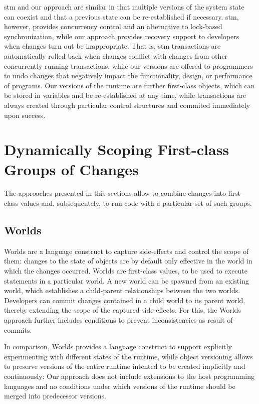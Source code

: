 \ac{stm} and our approach are similar in that multiple versions of the system state can coexist and that a previous state can be re-established if necessary.
\ac{stm}, however, provides concurrency control and an alternative to lock-based synchronization, while our approach provides recovery support to developers when changes turn out be inappropriate.
That is, \ac{stm} transactions are automatically rolled back when changes conflict with changes from other concurrently running transactions, while our versions are offered to programmers to undo changes that negatively impact the functionality, design, or performance of programs. 
Our versions of the runtime are further first-class objects, which can be stored in variables and be re-established at any time, while transactions are always created through particular control structures and commited immediately upon success.



\section{Dynamically Scoping First-class Groups of Changes}

The approaches presented in this sections allow to combine changes into first-class values and, subsequentely, to run code with a particular set of such groups.


\subsection{Worlds}

Worlds are a language construct to capture side-effects and control the scope of them: changes to the state of objects are by default only effective in the world in which the changes occurred.
Worlds are first-class values, to be used to execute statements in a particular world.
A new world can be spawned from an existing world, which establishes a child-parent relationships between the two worlds.
Developers can commit changes contained in a child world to its parent world, thereby extending the scope of the captured side-effects.
For this, the Worlds approach further includes conditions to prevent inconsistencies as result of commits.

In comparison, Worlds provides a language construct to support explicitly experimenting with different states of the runtime, while object versioning allows to preserve versions of the entire runtime intented to be created implicitly and continuously: Our approach does not include extensions to the host programming languages and no conditions under which versions of the runtime should be merged into predecessor versions.

